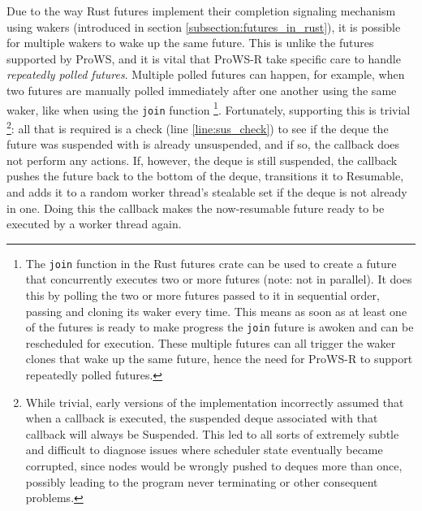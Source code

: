 \documentclass[bsc,frontabs,singlespacing,parskip,deptreport,normalheadings]{infthesis}
\begin{document}
Due to the way Rust futures implement their completion signaling mechanism using
wakers (introduced in section \ref{subsection:futures_in_rust}), it is possible
for multiple wakers to wake up the same future. This is unlike the futures
supported by ProWS, and it is vital that ProWS-R take specific care to handle
\textit{repeatedly polled futures}. Multiple polled futures can happen, for
example, when two futures are manually polled immediately after one another
using the same waker, like when using the \texttt{join} function \footnote{The
    \texttt{join} function in the Rust futures crate \cite{noauthor_join_nodate}
    can be used to create a future that concurrently executes two or more
    futures (note: not in parallel). It does this by polling the two or more
    futures passed to it in sequential order, passing and cloning its waker
    every time. This means as soon as at least one of the futures is ready to
    make progress the \texttt{join} future is awoken and can be rescheduled for
    execution. These multiple futures can all trigger the waker clones that wake
    up the same future, hence the need for ProWS-R to support repeatedly polled
    futures.}. Fortunately, supporting this is trivial \footnote{While trivial,
    early versions of the implementation incorrectly assumed that when a
    callback is executed, the suspended deque associated with that callback will
    always be Suspended. This led to all sorts of extremely subtle and difficult
    to diagnose issues where scheduler state eventually became corrupted, since
nodes would be wrongly pushed to deques more than once, possibly leading to the
program never terminating or other consequent problems.}: all that is required
is a check (line \ref{line:sus_check}) to see if the deque the future was
suspended with is already unsuspended, and if so, the callback does not perform
any actions. If, however, the deque is still suspended, the callback pushes the
future back to the bottom of the deque, transitions it to Resumable, and adds it
to a random worker thread's stealable set if the deque is not already in one.
Doing this the callback makes the now-resumable future ready to be executed by a
worker thread again.
\end{document}
